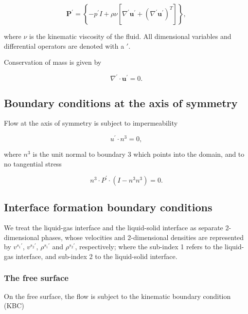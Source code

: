 \documentclass{article}
\begin{document}
\begin{equation}
\pmb{P}^{\prime} = \left\{-p^{\prime}I + \rho \nu \left[\nabla^{\prime}\pmb {u}^{\prime} + (\nabla^{\prime}\pmb {u}^{\prime})^{T}\right]\right\}, \tag{2.2}
\end{equation}

where \(\nu\) is the kinematic viscosity of the fluid. All dimensional variables and differential operators are denoted with a \(\prime\).

Conservation of mass is given by

\begin{equation}
\nabla^{\prime}\cdot \pmb {u}^{\prime} = 0. \tag{2.3}
\end{equation}

\subsection{Boundary conditions at the axis of symmetry}

Flow at the axis of symmetry is subject to impermeability

\begin{equation}
u^{\prime}\cdot n^{3} = 0, \tag{2.4}
\end{equation}

where \(n^3\) is the unit normal to boundary 3 which points into the domain, and to no tangential stress

\begin{equation}
n^3\cdot P^{\prime}\cdot (I - n^3 n^3) = 0. \tag{2.5}
\end{equation}

\subsection{Interface formation boundary conditions}

We treat the liquid-gas interface and the liquid-solid interface as separate 2-dimensional phases, whose velocities and 2-dimensional densities are represented by \(v^{s_1'}\), \(v^{s_2'}\), \(\rho^{s_1'}\) and \(\rho^{s_2'}\), respectively; where the sub-index 1 refers to the liquid-gas interface, and sub-index 2 to the liquid-solid interface.

\subsubsection{The free surface}

On the free surface, the flow is subject to the kinematic boundary condition (KBC)
\end{document}

